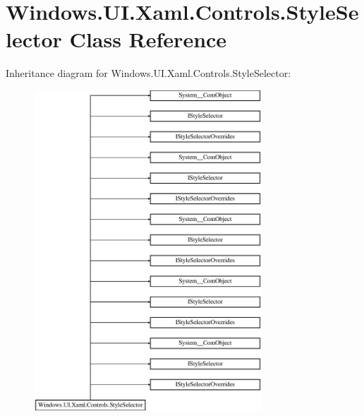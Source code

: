 \hypertarget{class_windows_1_1_u_i_1_1_xaml_1_1_controls_1_1_style_selector}{}\section{Windows.\+U\+I.\+Xaml.\+Controls.\+Style\+Selector Class Reference}
\label{class_windows_1_1_u_i_1_1_xaml_1_1_controls_1_1_style_selector}
Inheritance diagram for Windows.\+U\+I.\+Xaml.\+Controls.\+Style\+Selector\+:\begin{figure}[H]
\begin{center}
\leavevmode
\includegraphics[height=12.000000cm]{class_windows_1_1_u_i_1_1_xaml_1_1_controls_1_1_style_selector}
\end{center}
\end{figure}
